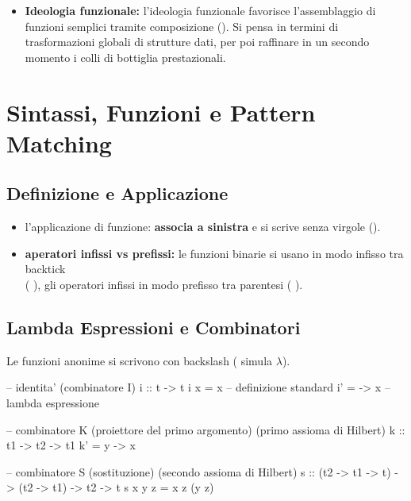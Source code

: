 \begin{itemize}
\begin{itemize}
        \item \textbf{ricorsione esplicita:} poiché il type system ci vieta di creare loop tramite l'auto-applicazione anonima di $\lambda x.xx$, in Haskell la non-terminazione si esprime unicamente attraverso la ricorsione esplicita. Definendo ad esempio , creiamo intenzionalmente una computazione divergente che il compilatore accetta, assegnandole il tipo più generale .
    \end{itemize}
    \item \textbf{Ideologia funzionale:} l'ideologia funzionale favorisce l'assemblaggio di funzioni semplici tramite composizione (). Si pensa in termini di trasformazioni globali di strutture dati, per poi raffinare in un secondo momento i colli di bottiglia prestazionali.
\end{itemize}

\section{Sintassi, Funzioni e Pattern Matching}

\subsection{Definizione e Applicazione}
\begin{itemize}
    \item l'applicazione di funzione: \textbf{associa a sinistra} e si scrive senza virgole ().
    \item \textbf{aperatori infissi vs prefissi:} le funzioni binarie si usano in modo infisso tra backtick \\ ( ), gli operatori infissi in modo prefisso tra parentesi ( ).
\end{itemize}

\subsection{Lambda Espressioni e Combinatori}
Le funzioni anonime si scrivono con backslash (\code{\textbackslash} simula $\lambda$).
\begin{haskellbox}{}
-- identita' (combinatore I)
i :: t -> t
i x = x           -- definizione standard
i' = \x -> x      -- lambda espressione

-- combinatore K (proiettore del primo argomento) (primo assioma di Hilbert)
k :: t1 -> t2 -> t1
k' = \x y -> x

-- combinatore S (sostituzione) (secondo assioma di Hilbert)
s :: (t2 -> t1 -> t) -> (t2 -> t1) -> t2 -> t
s x y z = x z (y z)
\end{haskellbox}

